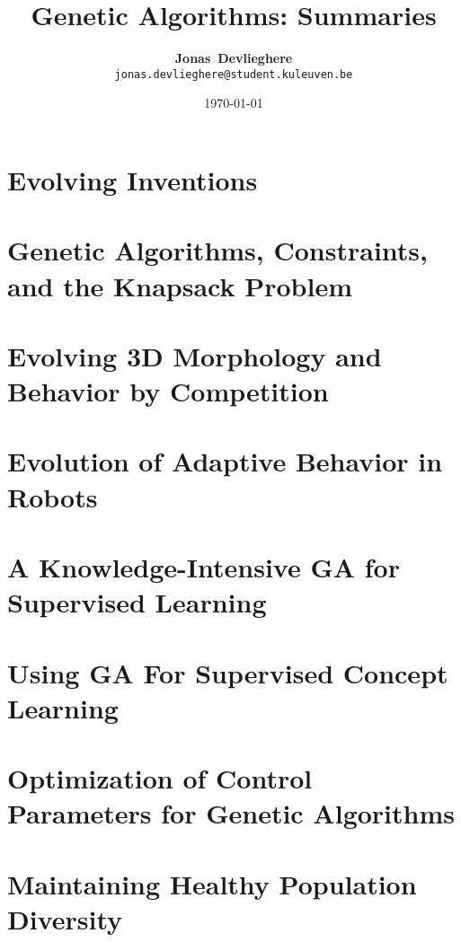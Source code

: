 \documentclass[a4paper, 10pt, oneside]{article}
\title{Genetic Algorithms: Summaries}
\date{\today}
\author{\textbf{Jonas~Devlieghere} \\ \texttt{jonas.devlieghere@student.kuleuven.be}}
\theoremstyle{definition}
\begin{document}
\maketitle
\newpage

\tableofcontents
\newpage

\section{Evolving Inventions}


\section{Genetic Algorithms, Constraints, and the Knapsack Problem}


\section{Evolving 3D Morphology and Behavior by Competition}


\section{Evolution of Adaptive Behavior in Robots}


\section{A Knowledge-Intensive GA for Supervised Learning}


\section{Using GA For Supervised Concept Learning}


\section{Optimization of Control Parameters for Genetic Algorithms}


\section{Maintaining Healthy Population Diversity}


\newpage
\appendix
\printbibliography
\end{document}
